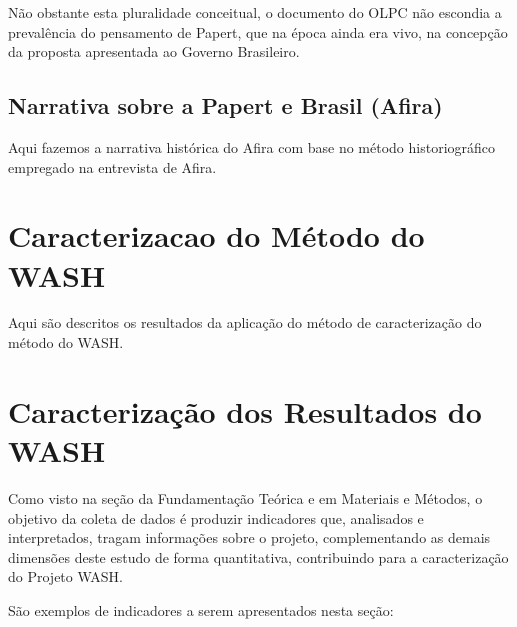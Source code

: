 \documentclass[
12pt,		%
openright,	%
twoside,  %
a4paper,			%
chapter=TITLE,		%
english,			%
french,				%
spanish,			%
brazil				%
]{USPSC-classe/USPSC_RedarTex}
\begin{document}
N\~ao obstante esta pluralidade conceitual, o documento do OLPC n\~ao escondia a preval\^encia do pensamento de Papert, que na \'epoca ainda era vivo, na concep\c{c}\~ao da proposta apresentada ao Governo Brasileiro.








\subsection[Narrativa sobre a Papert e Brasil (Afira)]{Narrativa sobre a Papert e Brasil (Afira)}\label{Narrativa sobre a Papert e Brasil (Afira)}
Aqui fazemos a narrativa hist\'orica do Afira com base no m\'etodo historiogr\'afico empregado na entrevista de Afira.








\section[Caracterizacao do M\'etodo do WASH]{Caracterizacao do M\'etodo do WASH}\label{Caracterizacao do M\'etodo do WASH}
Aqui s\~ao descritos os resultados da aplica\c{c}\~ao do m\'etodo de caracteriza\c{c}\~ao do m\'etodo do WASH.








\section[Caracteriza\c{c}\~ao dos Resultados do WASH]{Caracteriza\c{c}\~ao dos Resultados do WASH}\label{Caracteriza\c{c}\~ao dos Resultados do WASH}
Como visto na se\c{c}\~ao da Fundamenta\c{c}\~ao Te\'orica e em Materiais e M\'etodos, o objetivo da coleta de dados \'e produzir indicadores que, analisados e interpretados, tragam informa\c{c}\~oes sobre o projeto, complementando as demais dimens\~oes deste estudo de forma quantitativa, contribuindo para a caracteriza\c{c}\~ao do Projeto WASH.








S\~ao exemplos de indicadores a serem apresentados nesta se\c{c}\~ao:
\end{document}
